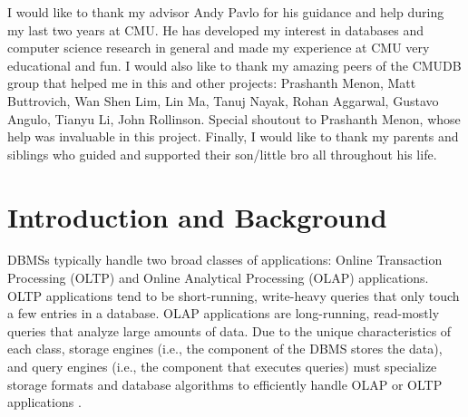 \documentclass[12pt]{cmuthesis}
\begin{document}
\begin{acknowledgments}
I would like to thank my advisor Andy Pavlo for his guidance and help during my last two years at CMU. He has developed my interest in databases and computer science research in general and made my experience at CMU very educational and fun. I would also like to thank my amazing peers of the CMUDB group that helped me in this and other projects: Prashanth Menon, Matt Buttrovich, Wan Shen Lim, Lin Ma, Tanuj Nayak, Rohan Aggarwal, Gustavo Angulo, Tianyu Li, John Rollinson. Special shoutout to Prashanth Menon, whose help was invaluable in this project. Finally, I would like to thank my parents and siblings who guided and supported their son/little bro all throughout his life.
\end{acknowledgments}



\tableofcontents
\listoffigures
\listoftables

\mainmatter


%
%
%
%
%


\chapter{Introduction and Background}
\label{chapter1}
DBMSs typically handle two broad classes of applications: Online Transaction Processing (OLTP) and Online Analytical Processing (OLAP) applications. OLTP applications tend to be short-running, write-heavy queries that only touch a few entries in a database. OLAP applications are long-running, read-mostly queries that analyze large amounts of data. Due to the unique characteristics of each class, storage engines (i.e., the component of the DBMS stores the data), and query engines (i.e., the component that executes queries) must specialize storage formats and database algorithms to efficiently handle OLAP or OLTP applications \cite{one_size_fits_all}.  
\end{document}
